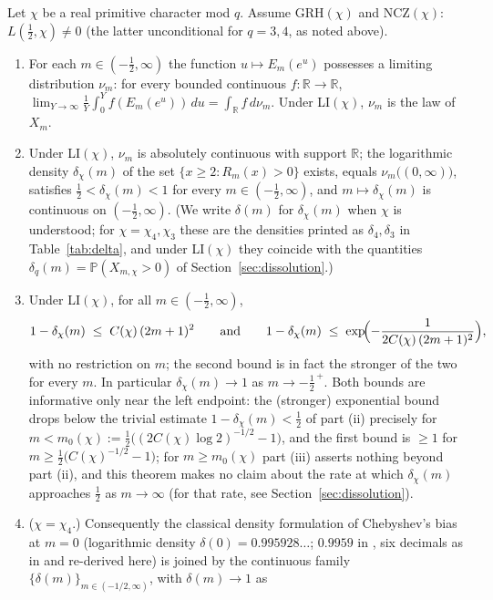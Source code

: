 \begin{theorem}\label{thm:interp}
Let $\chi$ be a real primitive character mod $q$. Assume GRH$(\chi)$
and NCZ$(\chi)$: $L(\tfrac12,\chi)\ne0$ (the latter unconditional for
$q=3,4$, as noted above).
\begin{enumerate}
\item[(i)] For each $m\in(-\tfrac12,\infty)$ the function
$u\mapsto E_m(e^u)$ possesses a limiting distribution
$\nu_m$: for every bounded continuous $f:\mathbb R\to\mathbb R$,
$\lim_{Y\to\infty}\frac1Y\int_0^Y f(E_m(e^u))\,du
=\int_{\mathbb R}f\,d\nu_m$. Under LI$(\chi)$, $\nu_m$ is the law of
$X_m$.
\item[(ii)] Under LI$(\chi)$, $\nu_m$ is absolutely continuous with
support $\mathbb R$; the logarithmic density
$\delta_\chi(m)$ of the set $\{x\ge2: R_m(x)>0\}$ exists, equals
$\nu_m\bigl((0,\infty)\bigr)$, satisfies
$\tfrac12<\delta_\chi(m)<1$ for every $m\in(-\tfrac12,\infty)$, and
$m\mapsto\delta_\chi(m)$ is continuous on $(-\tfrac12,\infty)$. (We
write $\delta(m)$ for $\delta_\chi(m)$ when $\chi$ is understood; for
$\chi=\chi_4,\chi_3$ these are the densities printed as
$\delta_4,\delta_3$ in Table~\ref{tab:delta}, and under LI$(\chi)$
they coincide with the quantities
$\delta_q(m)=\mathbb P(X_{m,\chi}>0)$ of
Section~\ref{sec:dissolution}.)
\item[(iii)] Under LI$(\chi)$, for all $m\in(-\tfrac12,\infty)$,
\[
1-\delta_\chi(m)\;\le\;C(\chi)\,(2m+1)^2
\qquad\text{and}\qquad
1-\delta_\chi(m)\;\le\;\exp\!\Bigl(-\frac{1}{2C(\chi)\,(2m+1)^2}\Bigr),
\]
with no restriction on $m$; the second bound is in fact the stronger of
the two for every $m$. In particular $\delta_\chi(m)\to1$ as
$m\to-\tfrac12^{\,+}$. Both bounds are informative only near the left
endpoint: the (stronger) exponential bound drops below the trivial
estimate $1-\delta_\chi(m)<\tfrac12$ of part (ii) precisely for
$m<m_0(\chi):=\tfrac12\bigl((2C(\chi)\log2)^{-1/2}-1\bigr)$, and the
first bound is $\ge1$ for $m\ge\tfrac12\bigl(C(\chi)^{-1/2}-1\bigr)$;
for $m\ge m_0(\chi)$ part (iii) asserts nothing beyond part (ii), and
this theorem makes no claim about the rate at which $\delta_\chi(m)$
approaches $\tfrac12$ as $m\to\infty$ (for that rate, see
Section~\ref{sec:dissolution}).
\item[(iv)] ($\chi=\chi_4$.) Consequently the classical density
formulation of
Chebyshev's bias at $m=0$ (logarithmic density
$\delta(0)=0.995928\ldots$; $0.9959$ in \cite{RS94}, six decimals as in
\cite{FM13} and re-derived here) is joined by the continuous family
$\{\delta(m)\}_{m\in(-1/2,\infty)}$, with $\delta(m)\to1$ as

\end{enumerate}
\end{theorem}
